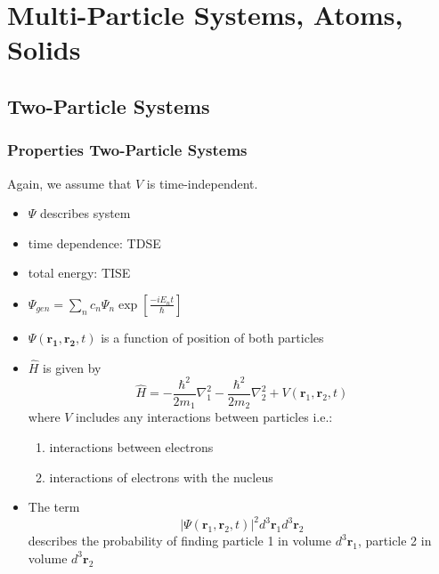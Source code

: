 \section{Multi-Particle Systems, Atoms, Solids}
\subsection{Two-Particle Systems}
\subsubsection{Properties Two-Particle Systems}
Again, we assume that $V$ is time-independent.

\newpar{}

\begin{itemize}
    \item $\Psi$ describes system
    \item time dependence: TDSE
    \item total energy: TISE
    \item $\Psi_{gen}=\sum_{n} c_{n} \Psi_{n} \exp\left[\frac{-i E_{n} t}{\hbar}\right]$
\end{itemize}

\newpar{}
\begin{itemize}
    \item $\Psi(\mathbf{r_1},\mathbf{r_2},t)$ is a function of position of both particles
    \item $\widehat{H}$ is given by
          \begin{equation*}
              \widehat{H}=-\frac{\hbar^{2}}{2m_{1}}\nabla_{1}^{2}-\frac{\hbar^{2}}{2m_{2}}\nabla_{2}^{2}+V(\mathbf{r}_{1},\mathbf{r}_{2},t)
          \end{equation*}
          where $V$ includes any interactions between particles i.e.:
          \begin{enumerate}
              \item interactions between  electrons
              \item interactions of electrons with the nucleus
          \end{enumerate}
    \item The term
          \begin{equation*}
              |\Psi(\mathbf{r}_{1},\mathbf{r}_{2},t)|^{2} d^{3}\mathbf{r}_{1} d^{3}\mathbf{r}_{2}
          \end{equation*}
          describes the probability of finding particle 1 in volume $d^{3}\mathbf{r}_{1}$, particle 2 in volume $d^{3}\mathbf{r}_{2}$
\end{itemize}

